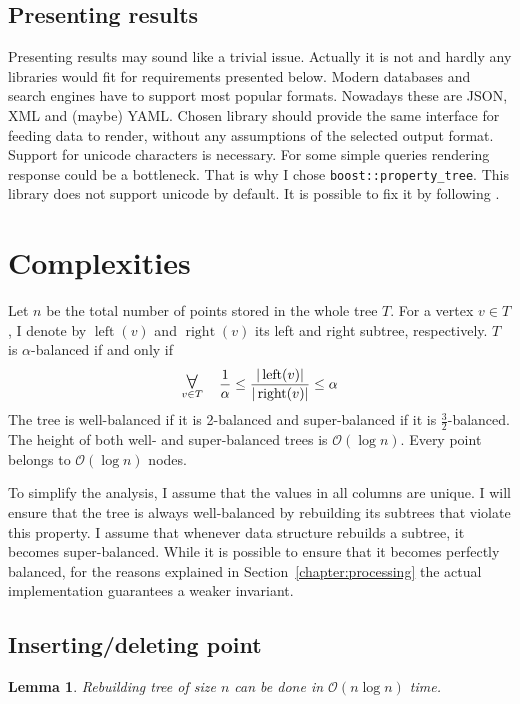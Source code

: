 \documentclass[10pt,a4paper]{article}
\newtheorem{lemma}{Lemma}
\DeclareMathOperator{\rightSon}{right}
\DeclareMathOperator{\leftSon}{left}
\newcommand{\Oh}{\mathcal{O}}
\newcommand\bigforall{\mbox{\Large $\mathsurround0pt\forall$}}
\begin{document}
\subsection{Presenting results}

Presenting results may sound like a trivial issue. Actually it is not and hardly any libraries would fit for requirements presented below. Modern databases and search engines have to support most popular formats. Nowadays these are JSON, XML and (maybe) YAML. Chosen library should provide the same interface for feeding data to render, without any assumptions of the selected output format. Support for unicode characters is necessary. For some simple queries rendering response could be a bottleneck. That is why I chose \verb|boost::property_tree|. This library does not support unicode by default. It is possible to fix it by following \cite{SOANS} .

\section{Complexities}
\label{chapter:complexity}

Let $n$ be the total number of points stored in the whole tree $T$. For a vertex $v\in T$, I denote by $\leftSon(v)$ and $\rightSon(v)$ its left and right subtree, respectively. $T$ is $\alpha$-balanced if and only if 
$$\displaystyle\mathop{\bigforall}_{v\in T} \quad \frac{1}{\alpha} \leq \frac{|\leftSon(v)|}{|\rightSon(v)|} \leq \alpha$$
The tree is well-balanced if it is 2-balanced and super-balanced if it is  $\frac{3}{2}$-balanced. The height of both well- and super-balanced trees is $\Oh(\log n)$. Every point belongs to $\Oh(\log n)$ nodes. 

To simplify the analysis, I assume that the values in all columns are unique. I will ensure that the tree is always well-balanced by rebuilding its subtrees that violate this property. I assume that whenever data structure rebuilds a subtree, it becomes super-balanced. While it is possible to ensure that it becomes perfectly balanced, for the reasons explained in Section~\ref{chapter:processing} the actual implementation guarantees a weaker invariant.

\subsection{Inserting/deleting point}

\begin{lemma}\label{lem:1}
Rebuilding tree of size $n$ can be done in $\Oh(n \log n)$ time.
\end{lemma}
\end{document}
